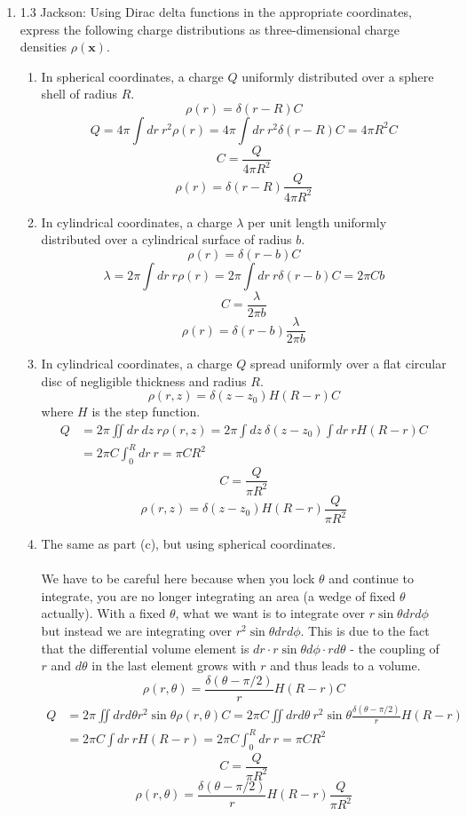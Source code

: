 \documentclass[11pt,letterpaper]{article}
\newcommand{\vect}[1]{\mathbf{#1}}
\begin{document}
\begin{enumerate}
\item 1.3 Jackson: Using Dirac delta functions in the appropriate coordinates, express the following charge distributions as three-dimensional charge densities $\rho(\vect x)$.
\begin{enumerate}
\item In spherical coordinates, a charge $Q$ uniformly distributed over a sphere shell of radius $R$.
$$ \rho(r) = \delta(r-R)C$$
$$Q = 4\pi\int{dr\ r^2\rho(r)} = 4\pi\int{dr\ r^2\delta(r-R)C} =4\pi R^2C$$
$$C = \frac{Q}{4\pi R^2}$$
$$\rho(r) = \delta(r-R)\frac{Q}{4\pi R^2}$$
\item In cylindrical coordinates, a charge $\lambda$ per unit length uniformly distributed over a cylindrical surface of radius $b$.
$$\rho(r) = \delta(r-b)C$$
$$\lambda = 2\pi\int{dr\ r\rho(r)} =2\pi\int{dr\ r\delta(r-b)C} = 2\pi Cb$$
$$C = \frac{\lambda}{2\pi b}$$
$$\rho(r) = \delta(r-b)\frac{\lambda}{2\pi b}$$

\item In cylindrical coordinates, a charge $Q$ spread uniformly over a flat circular disc of negligible thickness and radius $R$.
$$\rho(r,z) = \delta(z-z_0)H(R-r)C$$
where $H$ is the step function.
\begin{align*}Q &= 2\pi\iint{dr\ dz\ r\rho(r,z)} = 2\pi\int{dz\ \delta(z-z_0)}\int{dr\ rH(R-r)C}\\
&= 2\pi C\int_{0}^{R}{dr\ r} = \pi CR^2
\end{align*}
$$C = \frac{Q}{\pi R^2}$$
$$\rho(r,z) = \delta(z-z_0)H(R-r)\frac{Q}{\pi R^2}$$

\item The same as part (c), but using spherical coordinates.
\\ \\We have to be careful here because when you lock $\theta$ and continue to integrate, you are no longer integrating an area (a wedge of fixed $\theta$ actually). With a fixed $\theta$, what we want is to integrate over $r\sin\theta drd\phi$ but instead we are integrating over $r^2\sin\theta drd\phi$. This is due to the fact that the differential volume element is $dr\cdot r\sin\theta d\phi\cdot rd\theta$ - the coupling of $r$ and $d\theta$ in the last element grows with $r$ and thus leads to a volume.
$$\rho(r,\theta) =\frac{\delta(\theta -\pi/2)}{r}H(R-r)C$$
\begin{align*}Q&=2\pi\iint{drd\theta r^2\sin\theta \rho(r,\theta)C}=2\pi C\iint{drd\theta\ r^2\sin\theta\frac{\delta(\theta-\pi/2)}{r}H(R-r)}\\
&=2\pi C\int{dr\ rH(R-r)} = 2\pi C\int_{0}^{R}{dr\ r} = \pi C R^2
\end{align*}
$$C = \frac{Q}{\pi R^2}$$
$$\rho(r,\theta) = \frac{\delta(\theta-\pi/2)}{r}H(R-r)\frac{Q}{\pi R^2}$$
\end{enumerate}



\end{enumerate}
\end{document}
